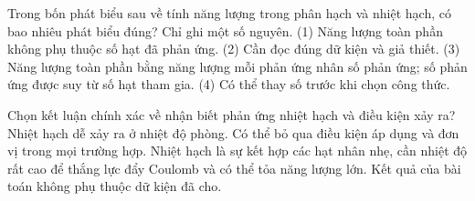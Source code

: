 \begin{ex}
Trong bốn phát biểu sau về tính năng lượng trong phân hạch và nhiệt hạch, có bao nhiêu phát biểu đúng? Chỉ ghi một số nguyên. (1) Năng lượng toàn phần không phụ thuộc số hạt đã phản ứng. (2) Cần đọc đúng dữ kiện và giả thiết. (3) Năng lượng toàn phần bằng năng lượng mỗi phản ứng nhân số phản ứng; số phản ứng được suy từ số hạt tham gia. (4) Có thể thay số trước khi chọn công thức.
\end{ex}

\begin{ex}
Chọn kết luận chính xác về nhận biết phản ứng nhiệt hạch và điều kiện xảy ra?
\choice
{Nhiệt hạch dễ xảy ra ở nhiệt độ phòng.}
{Có thể bỏ qua điều kiện áp dụng và đơn vị trong mọi trường hợp.}
{\True Nhiệt hạch là sự kết hợp các hạt nhân nhẹ, cần nhiệt độ rất cao để thắng lực đẩy Coulomb và có thể tỏa năng lượng lớn.}
{Kết quả của bài toán không phụ thuộc dữ kiện đã cho.}
\end{ex}

